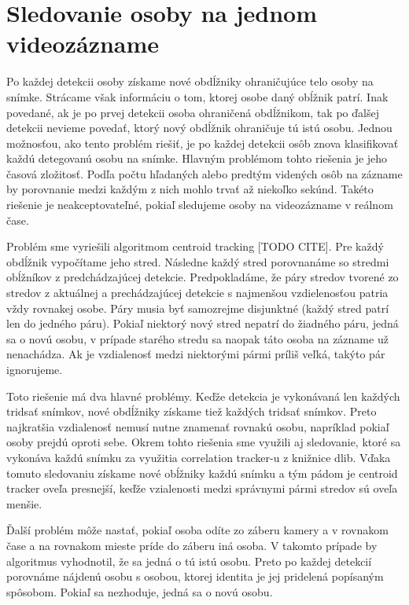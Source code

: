\section{Sledovanie osoby na jednom videozázname}
Po každej detekcii osoby získame nové obdĺžniky ohraničujúce telo osoby na snímke. 
Strácame však informáciu o tom, ktorej osobe daný obĺžnik patrí.
Inak povedané, ak je po prvej detekcii osoba ohraničená obdĺžnikom, tak po ďalšej detekcii nevieme povedať, ktorý nový obdĺžnik ohraničuje tú istú osobu.
Jednou možnosťou, ako tento problém riešiť, je po každej detekcii osôb znova klasifikovať každú detegovanú osobu na snímke.
Hlavným problémom tohto riešenia je jeho časová zložitosť. 
Podľa počtu hľadaných alebo predtým videných osôb na zázname by porovnanie medzi každým z nich mohlo trvať až niekoľko sekúnd.
Takéto riešenie je neakceptovateľné, pokiaľ sledujeme osoby na videozázname v reálnom čase. 

Problém sme vyriešili algoritmom centroid tracking [TODO CITE].
Pre každý obdĺžnik vypočítame jeho stred. 
Následne každý stred porovnanáme so stredmi obĺžníkov z predchádzajúcej detekcie.
Predpokladáme, že páry stredov tvorené zo stredov z aktuálnej a prechádzajúcej detekcie s najmenšou vzdielenosťou patria vždy rovnakej osobe. 
Páry musia byť samozrejme disjunktné (každý stred patrí len do jedného páru).
Pokiaľ niektorý nový stred nepatrí do žiadného páru, jedná sa o novú osobu, v prípade starého stredu sa naopak táto osoba na zázname už nenachádza.
Ak je vzdialenosť medzi niektorými pármi príliš veľká, takýto pár ignorujeme.

Toto riešenie má dva hlavné problémy.
Keďže detekcia je vykonávaná len každých tridsať snímkov, nové obdĺžniky získame tiež každých tridsať snímkov.
Preto najkratšia vzdialenosť nemusí nutne znamenať rovnakú osobu, napríklad pokiaľ osoby prejdú oproti sebe.
Okrem tohto riešenia sme využili aj sledovanie, ktoré sa vykonáva každú snímku za využitia correlation tracker-u z knižnice dlib.
Vďaka tomuto sledovaniu získame nové obĺžniky každú snímku a tým pádom je centroid tracker oveľa presnejší, keďže vzialenosti medzi správnymi pármi stredov sú oveľa menšie.

Ďalší problém môže nastať, pokiaľ osoba odíte zo záberu kamery a v rovnakom čase a na rovnakom mieste príde do záberu iná osoba.
V takomto prípade by algoritmus vyhodnotil, že sa jedná o tú istú osobu.
Preto po každej detekcií porovnáme nájdenú osobu s osobou, ktorej identita je jej pridelená popísaným spôsobom.
Pokiaľ sa nezhoduje, jedná sa o novú osobu.

